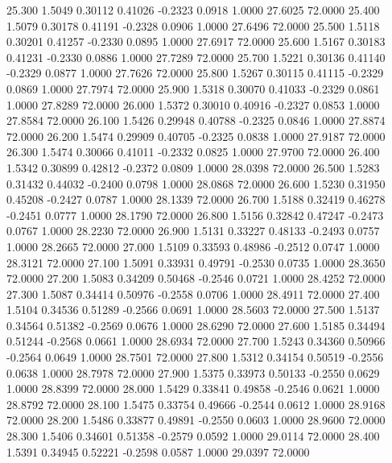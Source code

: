   25.300   1.5049   0.30112   0.41026  -0.2323   0.0918   1.0000  27.6025  72.0000
  25.400   1.5079   0.30178   0.41191  -0.2328   0.0906   1.0000  27.6496  72.0000
  25.500   1.5118   0.30201   0.41257  -0.2330   0.0895   1.0000  27.6917  72.0000
  25.600   1.5167   0.30183   0.41231  -0.2330   0.0886   1.0000  27.7289  72.0000
  25.700   1.5221   0.30136   0.41140  -0.2329   0.0877   1.0000  27.7626  72.0000
  25.800   1.5267   0.30115   0.41115  -0.2329   0.0869   1.0000  27.7974  72.0000
  25.900   1.5318   0.30070   0.41033  -0.2329   0.0861   1.0000  27.8289  72.0000
  26.000   1.5372   0.30010   0.40916  -0.2327   0.0853   1.0000  27.8584  72.0000
  26.100   1.5426   0.29948   0.40788  -0.2325   0.0846   1.0000  27.8874  72.0000
  26.200   1.5474   0.29909   0.40705  -0.2325   0.0838   1.0000  27.9187  72.0000
  26.300   1.5474   0.30066   0.41011  -0.2332   0.0825   1.0000  27.9700  72.0000
  26.400   1.5342   0.30899   0.42812  -0.2372   0.0809   1.0000  28.0398  72.0000
  26.500   1.5283   0.31432   0.44032  -0.2400   0.0798   1.0000  28.0868  72.0000
  26.600   1.5230   0.31950   0.45208  -0.2427   0.0787   1.0000  28.1339  72.0000
  26.700   1.5188   0.32419   0.46278  -0.2451   0.0777   1.0000  28.1790  72.0000
  26.800   1.5156   0.32842   0.47247  -0.2473   0.0767   1.0000  28.2230  72.0000
  26.900   1.5131   0.33227   0.48133  -0.2493   0.0757   1.0000  28.2665  72.0000
  27.000   1.5109   0.33593   0.48986  -0.2512   0.0747   1.0000  28.3121  72.0000
  27.100   1.5091   0.33931   0.49791  -0.2530   0.0735   1.0000  28.3650  72.0000
  27.200   1.5083   0.34209   0.50468  -0.2546   0.0721   1.0000  28.4252  72.0000
  27.300   1.5087   0.34414   0.50976  -0.2558   0.0706   1.0000  28.4911  72.0000
  27.400   1.5104   0.34536   0.51289  -0.2566   0.0691   1.0000  28.5603  72.0000
  27.500   1.5137   0.34564   0.51382  -0.2569   0.0676   1.0000  28.6290  72.0000
  27.600   1.5185   0.34494   0.51244  -0.2568   0.0661   1.0000  28.6934  72.0000
  27.700   1.5243   0.34360   0.50966  -0.2564   0.0649   1.0000  28.7501  72.0000
  27.800   1.5312   0.34154   0.50519  -0.2556   0.0638   1.0000  28.7978  72.0000
  27.900   1.5375   0.33973   0.50133  -0.2550   0.0629   1.0000  28.8399  72.0000
  28.000   1.5429   0.33841   0.49858  -0.2546   0.0621   1.0000  28.8792  72.0000
  28.100   1.5475   0.33754   0.49666  -0.2544   0.0612   1.0000  28.9168  72.0000
  28.200   1.5486   0.33877   0.49891  -0.2550   0.0603   1.0000  28.9600  72.0000
  28.300   1.5406   0.34601   0.51358  -0.2579   0.0592   1.0000  29.0114  72.0000
  28.400   1.5391   0.34945   0.52221  -0.2598   0.0587   1.0000  29.0397  72.0000
